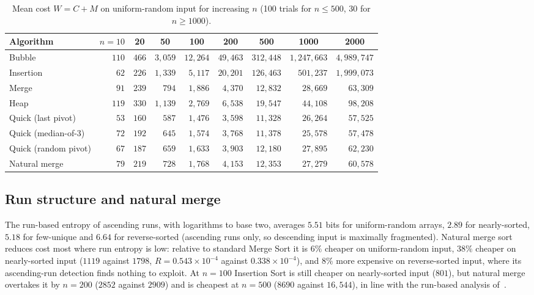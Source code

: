 \documentclass[10pt,journal]{IEEEtran}
\begin{document}
\begin{table}[!t]
\centering
\caption{Mean cost $W=C+M$ on uniform-random input for increasing $n$ (100 trials for $n\le500$, 30 for $n\ge1000$).}
\label{tab:sweep}
\scriptsize
\setlength{\tabcolsep}{6pt}
\begin{tabular}{@{}lrrrrrrrr@{}}
\toprule
Algorithm & \multicolumn{1}{c}{$n=10$} & \multicolumn{1}{c}{20} & \multicolumn{1}{c}{50} & \multicolumn{1}{c}{100} & \multicolumn{1}{c}{200} & \multicolumn{1}{c}{500} & \multicolumn{1}{c}{1000} & \multicolumn{1}{c}{2000} \\
\midrule
Bubble & $110$ & $466$ & $3{,}059$ & $12{,}264$ & $49{,}463$ & $312{,}448$ & $1{,}247{,}663$ & $4{,}989{,}747$ \\
Insertion & $62$ & $226$ & $1{,}339$ & $5{,}117$ & $20{,}201$ & $126{,}463$ & $501{,}237$ & $1{,}999{,}073$ \\
Merge & $91$ & $239$ & $794$ & $1{,}886$ & $4{,}370$ & $12{,}832$ & $28{,}669$ & $63{,}309$ \\
Heap & $119$ & $330$ & $1{,}139$ & $2{,}769$ & $6{,}538$ & $19{,}547$ & $44{,}108$ & $98{,}208$ \\
Quick (last pivot) & $53$ & $160$ & $587$ & $1{,}476$ & $3{,}598$ & $11{,}328$ & $26{,}264$ & $57{,}525$ \\
Quick (median-of-3) & $72$ & $192$ & $645$ & $1{,}574$ & $3{,}768$ & $11{,}378$ & $25{,}578$ & $57{,}478$ \\
Quick (random pivot) & $67$ & $187$ & $659$ & $1{,}633$ & $3{,}903$ & $12{,}180$ & $27{,}895$ & $62{,}230$ \\
Natural merge & $79$ & $219$ & $728$ & $1{,}768$ & $4{,}153$ & $12{,}353$ & $27{,}279$ & $60{,}578$ \\
\bottomrule
\end{tabular}
\end{table}

\subsection{Run structure and natural merge}
The run-based entropy of ascending runs, with logarithms to base two, averages $5.51$ bits for uniform-random arrays, $2.89$ for nearly-sorted, $5.18$ for few-unique and $6.64$ for reverse-sorted (ascending runs only, so descending input is maximally fragmented). Natural merge sort reduces cost most where run entropy is low: relative to standard Merge Sort it is $6\%$ cheaper on uniform-random input, $38\%$ cheaper on nearly-sorted input ($1119$ against $1798$, $R=0.543\times10^{-4}$ against $0.338\times10^{-4}$), and $8\%$ more expensive on reverse-sorted input, where its ascending-run detection finds nothing to exploit. At $n=100$ Insertion Sort is still cheaper on nearly-sorted input ($801$), but natural merge overtakes it by $n=200$ ($2852$ against $2909$) and is cheapest at $n=500$ ($8690$ against $16{,}544$), in line with the run-based analysis of~\cite{ref5}.
\end{document}
